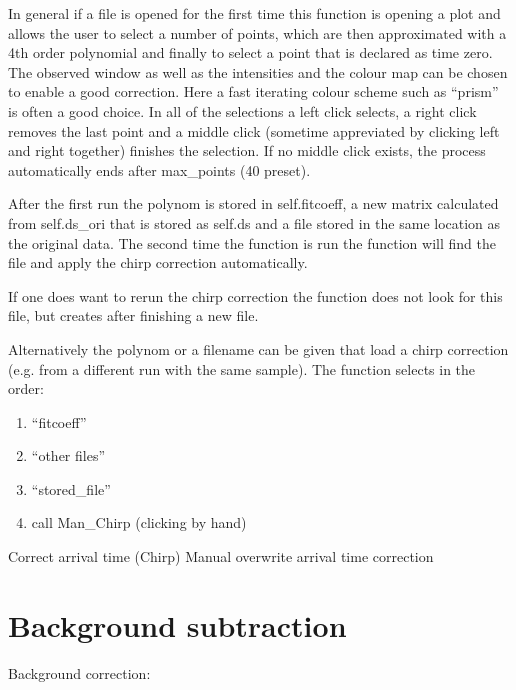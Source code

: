 \documentclass[letterpaper,10pt,english]{sphinxmanual}
\begin{document}
In general if a file is opened for the first time this function is opening
a plot and allows the user to select a number of points, which are then
approximated with a 4th order polynomial and finally to select a point
that is declared as time zero. The observed window as well as the intensities
and the colour map can be chosen to enable a good correction. Here a fast
iterating colour scheme such as “prism” is often a good choice. In all of the
selections a left click selects, a right click removes the last point and
a middle click (sometime appreviated by clicking left and right together)
finishes the selection. If no middle click exists, the process
automatically ends after max\_points (40 preset).

After the first run the polynom is stored in self.fitcoeff, a new matrix
calculated from self.ds\_ori that is stored as self.ds and a file stored in the
same location as the original data. The second time the function  is
run the function will find the file and apply the chirp correction automatically.

If one does want to re\sphinxhyphen{}run the chirp correction the function  does
not look for this file, but creates after finishing a new file.

Alternatively the polynom or a filename can be given that load a chirp correction
(e.g. from a different run with the same sample).
The function  selects in the order:
\begin{enumerate}
%
\item {} 
“fitcoeff”

\item {} 
“other files”

\item {} 
“stored\_file”

\item {} 
call Man\_Chirp (clicking by hand)

\end{enumerate}

Correct arrival time (Chirp)    {\hyperref[\detokenize{plot_func:plot_func.TA.Cor_Chirp}]{}}
Manual overwrite arrival time correction        {\hyperref[\detokenize{plot_func:plot_func.TA.Man_Chirp}]{}}


\section{Background subtraction}
\label{\detokenize{Shaping:background-subtraction}}
Background correction:                  {\hyperref[\detokenize{plot_func:plot_func.TA.Background}]{}}
\end{document}

